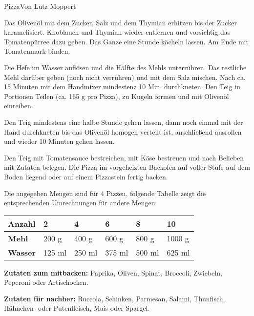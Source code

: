 \begin{recipe}{Pizza}{Von Lutz Moppert}
  \label{Pizza}


  \steps

  Das Olivenöl mit dem Zucker, Salz und dem Thymian erhitzen bis der Zucker
  karamelisiert. Knoblauch und Thymian wieder entfernen und vorsichtig das
  Tomatenpürree dazu geben. Das Ganze eine Stunde köcheln lassen. Am Ende mit
  Tomatenmark binden.

  Die Hefe im Wasser auflösen und die Hälfte des Mehls unterrühren. Das
  restliche Mehl darüber geben (noch nicht verrühren) und mit dem Salz mischen.
  Nach ca.  15 Minuten mit dem Handmixer mindestenz 10 Min. durchkneten. Den
  Teig in Portionen Teilen (ca. 165 g pro Pizza), zu Kugeln formen und mit
  Olivenöl einreiben.

  Den Teig mindestens eine halbe Stunde gehen lassen, dann noch einmal mit der
  Hand durchkneten bis das Olivenöl homogen verteilt ist, anschließend
  ausrollen und wieder 10 Minuten gehen lassen.

  Den Teig mit Tomatensauce bestreichen, mit Käse bestreuen und nach Belieben
  mit Zutaten belegen. Die Pizza im vorgeheizten Backofen auf voller Stufe
  auf dem Boden liegend oder auf einem Pizzastein fertig backen.

  Die angegeben Mengen sind für 4 Pizzen, folgende Tabelle zeigt die
  entsprechenden Umrechnungen für andere Mengen:

  \begin{tabular}[h]{l|l|l|l|l|l}
    \textbf{Anzahl} & 2 & 4 & 6 & 8 & 10 \\
    \hline
    \textbf{Mehl} & 200 g & 400 g & 600 g & 800 g & 1000 g \\
    \hline
    \textbf{Wasser} & 125 ml & 250 ml & 375 ml & 500 ml & 625 ml \\
  \end{tabular}

  \textbf{Zutaten zum mitbacken:}
  Paprika, Oliven, Spinat, Broccoli, Zwiebeln, Peperoni oder Artischocken.

  \textbf{Zutaten für nachher:}
  Ruccola, Schinken, Parmesan, Salami, Thunfisch,   Hähnchen- oder
  Putenfleisch, Mais oder Spargel.

\end{recipe}
